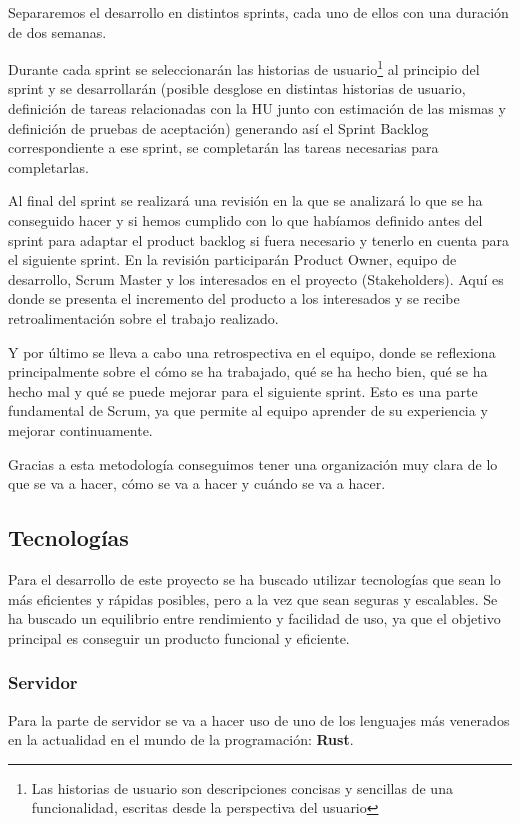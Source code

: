 Separaremos el desarrollo en distintos sprints, cada uno de ellos con una duración de dos semanas.

Durante cada sprint se seleccionarán las historias de usuario\footnote{Las historias de usuario son descripciones concisas y sencillas de una funcionalidad, escritas desde la perspectiva del usuario} al principio del sprint y se desarrollarán (posible desglose en distintas historias de usuario, definición de tareas relacionadas con la HU junto con estimación de las mismas y definición de pruebas de aceptación) generando así el Sprint Backlog correspondiente a ese sprint, se completarán las tareas necesarias para completarlas.

Al final del sprint se realizará una revisión en la que se analizará lo que se ha conseguido hacer y si hemos cumplido con lo que habíamos definido antes del sprint para adaptar el product backlog si fuera necesario y tenerlo en cuenta para el siguiente sprint. En la revisión participarán Product Owner, equipo de desarrollo, Scrum Master y los interesados en el proyecto (Stakeholders). Aquí es donde se presenta el incremento del producto a los interesados y se recibe retroalimentación sobre el trabajo realizado.

Y por último se lleva a cabo una retrospectiva en el equipo, donde se reflexiona principalmente sobre el cómo se ha trabajado, qué se ha hecho bien, qué se ha hecho mal y qué se puede mejorar para el siguiente sprint. Esto es una parte fundamental de Scrum, ya que permite al equipo aprender de su experiencia y mejorar continuamente.

Gracias a esta metodología conseguimos tener una organización muy clara de lo que se va a hacer, cómo se va a hacer y cuándo se va a hacer.

\subsection{Tecnologías}
Para el desarrollo de este proyecto se ha buscado utilizar tecnologías que sean lo más eficientes y rápidas posibles, pero a la vez que sean seguras y escalables. Se ha buscado un equilibrio entre rendimiento y facilidad de uso, ya que el objetivo principal es conseguir un producto funcional y eficiente.

\subsubsection{Servidor}
Para la parte de servidor se va a hacer uso de uno de los lenguajes más venerados en la actualidad en el mundo de la programación: \textbf{Rust}.

